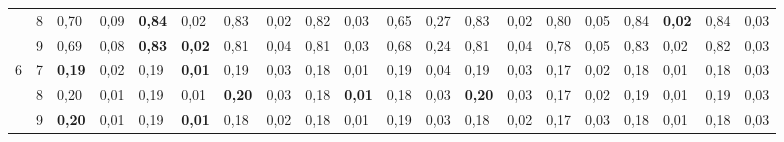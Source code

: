\documentclass[conference]{IEEEtran}
\begin{document}
\begin{table}[]
\begin{tabular}{|cl|ll|ll|ll|ll|ll|ll|ll|ll|ll|}
		\multicolumn{1}{|c|}{}                    & 8 & \multicolumn{1}{l|}{0,70}          & 0,09          & \multicolumn{1}{l|}{\textbf{0,84}} & 0,02          & \multicolumn{1}{l|}{0,83}          & 0,02          & \multicolumn{1}{l|}{0,82} & 0,03          & \multicolumn{1}{l|}{0,65}                 & 0,27          & \multicolumn{1}{l|}{0,83}          & 0,02          & \multicolumn{1}{l|}{0,80}          & 0,05          & \multicolumn{1}{l|}{0,84}          & \textbf{0,02} & \multicolumn{1}{l|}{0,84}          & 0,03          \\ \cline{2-20} 
		\multicolumn{1}{|c|}{}                    & 9 & \multicolumn{1}{l|}{0,69}          & 0,08          & \multicolumn{1}{l|}{\textbf{0,83}} & \textbf{0,02} & \multicolumn{1}{l|}{0,81}          & 0,04          & \multicolumn{1}{l|}{0,81} & 0,03          & \multicolumn{1}{l|}{0,68}                 & 0,24          & \multicolumn{1}{l|}{0,81}          & 0,04          & \multicolumn{1}{l|}{0,78}          & 0,05          & \multicolumn{1}{l|}{0,83}          & 0,02          & \multicolumn{1}{l|}{0,82}          & 0,03          \\ \hline
		\multicolumn{1}{|c|}{\multirow{3}{*}{6}}  & 7 & \multicolumn{1}{l|}{\textbf{0,19}} & 0,02          & \multicolumn{1}{l|}{0,19}          & \textbf{0,01} & \multicolumn{1}{l|}{0,19}          & 0,03          & \multicolumn{1}{l|}{0,18} & 0,01          & \multicolumn{1}{l|}{0,19}                 & 0,04          & \multicolumn{1}{l|}{0,19}          & 0,03          & \multicolumn{1}{l|}{0,17}          & 0,02          & \multicolumn{1}{l|}{0,18}          & 0,01          & \multicolumn{1}{l|}{0,18}          & 0,03          \\ \cline{2-20} 
		\multicolumn{1}{|c|}{}                    & 8 & \multicolumn{1}{l|}{0,20}          & 0,01          & \multicolumn{1}{l|}{0,19}          & 0,01          & \multicolumn{1}{l|}{\textbf{0,20}} & 0,03          & \multicolumn{1}{l|}{0,18} & \textbf{0,01} & \multicolumn{1}{l|}{0,18}                 & 0,03          & \multicolumn{1}{l|}{\textbf{0,20}} & 0,03          & \multicolumn{1}{l|}{0,17}          & 0,02          & \multicolumn{1}{l|}{0,19}          & 0,01          & \multicolumn{1}{l|}{0,19}          & 0,03          \\ \cline{2-20} 
		\multicolumn{1}{|c|}{}                    & 9 & \multicolumn{1}{l|}{\textbf{0,20}} & 0,01          & \multicolumn{1}{l|}{0,19}          & \textbf{0,01} & \multicolumn{1}{l|}{0,18}          & 0,02          & \multicolumn{1}{l|}{0,18} & 0,01          & \multicolumn{1}{l|}{0,19}                 & 0,03          & \multicolumn{1}{l|}{0,18}          & 0,02          & \multicolumn{1}{l|}{0,17}          & 0,03          & \multicolumn{1}{l|}{0,18}          & 0,01          & \multicolumn{1}{l|}{0,18}          & 0,03          \\ \hline

\end{tabular}
\end{table}
\end{document}
